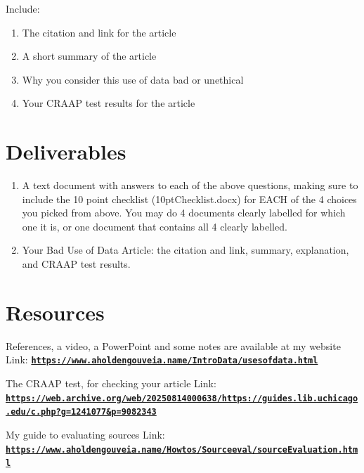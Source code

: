 \documentclass[12pt]{article}
\begin{document}
Include:
\begin{enumerate}
    \item The citation and link for the article
    \item A short summary of the article
    \item Why you consider this use of data bad or unethical
    \item Your CRAAP test results for the article
\end{enumerate}

\section*{Deliverables}
\begin{enumerate}
    \item A text document with answers to each of the above questions, making sure to include the 10 point checklist (10ptChecklist.docx) for EACH of the 4 choices you picked from above.  You may do 4 documents clearly labelled for which one it is, or one document that contains all 4 clearly labelled.
    \item Your Bad Use of Data Article: the citation and link, summary, explanation, and CRAAP test results.
\end{enumerate}

\section*{Resources}
References, a video, a PowerPoint and some notes are available at my website
Link: \href{https://www.aholdengouveia.name/IntroData/usesofdata.html}{\textbf{\nolinkurl{https://www.aholdengouveia.name/IntroData/usesofdata.html}}}

The CRAAP test, for checking your article
Link: \href{https://web.archive.org/web/20250814000638/https://guides.lib.uchicago.edu/c.php?g=1241077&p=9082343}{\textbf{\nolinkurl{https://web.archive.org/web/20250814000638/https://guides.lib.uchicago.edu/c.php?g=1241077&p=9082343}}}

My guide to evaluating sources
Link: \href{https://www.aholdengouveia.name/Howtos/Sourceeval/sourceEvaluation.html}{\textbf{\nolinkurl{https://www.aholdengouveia.name/Howtos/Sourceeval/sourceEvaluation.html}}}
\end{document}
